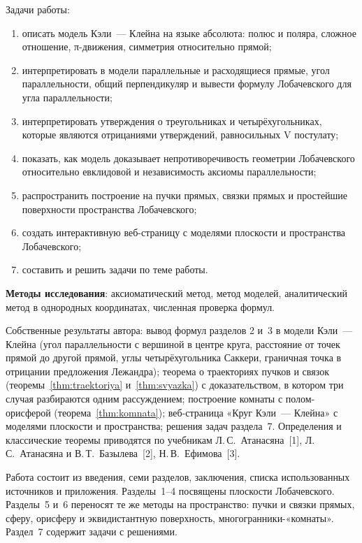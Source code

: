 Задачи работы:
\begin{enumerate}
  \item описать модель Кэли~--- Клейна на языке абсолюта: полюс и поляра, сложное отношение, π-движения, симметрия относительно прямой;
  \item интерпретировать в модели параллельные и расходящиеся прямые, угол параллельности, общий перпендикуляр и вывести формулу Лобачевского для угла параллельности;
  \item интерпретировать утверждения о треугольниках и четырёхугольниках, которые являются отрицаниями утверждений, равносильных V постулату;
  \item показать, как модель доказывает непротиворечивость геометрии Лобачевского относительно евклидовой и независимость аксиомы параллельности;
  \item распространить построение на пучки прямых, связки прямых и простейшие поверхности пространства Лобачевского;
  \item создать интерактивную веб-страницу с моделями плоскости и пространства Лобачевского;
  \item составить и решить задачи по теме работы.
\end{enumerate}

\textbf{Методы исследования}: аксиоматический метод, метод моделей, аналитический метод в однородных координатах, численная проверка формул.

Собственные результаты автора: вывод формул разделов 2 и~3 в модели Кэли~--- Клейна (угол параллельности с вершиной в центре круга, расстояние от точек прямой до другой прямой, углы четырёхугольника Саккери, граничная точка в отрицании предложения Лежандра); теорема о траекториях пучков и связок (теоремы~\ref{thm:traektoriya} и~\ref{thm:svyazka}) с доказательством, в котором три случая разбираются одним рассуждением; построение комнаты с полом-орисферой (теорема~\ref{thm:komnata}); веб-страница «Круг Кэли~--- Клейна» с моделями плоскости и пространства; решения задач раздела~7. Определения и классические теоремы приводятся по учебникам Л.\,С.~Атанасяна~[1], Л.\,С.~Атанасяна и В.\,Т.~Базылева~[2], Н.\,В.~Ефимова~[3].

Работа состоит из введения, семи разделов, заключения, списка использованных источников и приложения. Разделы~1--4 посвящены плоскости Лобачевского. Разделы~5 и~6 переносят те же методы на пространство: пучки и связки прямых, сферу, орисферу и эквидистантную поверхность, многогранники-«комнаты». Раздел~7 содержит задачи с решениями.
